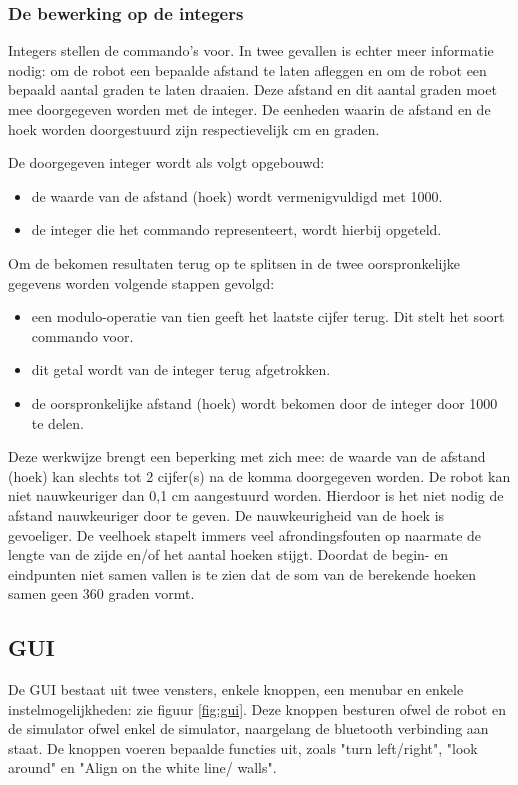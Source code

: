 \documentclass[tt3]{penoverslag}
\begin{document}
\subsubsection{De bewerking op de integers} %
\label{sssec:integer}
Integers stellen de commando's voor. In twee gevallen is echter meer informatie nodig: om de robot een bepaalde afstand te laten afleggen en om de robot een bepaald aantal graden te laten draaien. Deze afstand en dit aantal graden moet mee doorgegeven worden met de integer. De eenheden waarin de afstand en de hoek worden doorgestuurd zijn respectievelijk cm en graden.

De doorgegeven integer wordt als volgt opgebouwd:

\begin{itemize}
\item de waarde van de afstand (hoek) wordt vermenigvuldigd met 1000.
\item de integer die het commando representeert, wordt hierbij opgeteld.
\end{itemize}

Om de bekomen resultaten terug op te splitsen in de twee oorspronkelijke gegevens worden volgende stappen gevolgd:

\begin{itemize}
\item een modulo-operatie van tien geeft het laatste cijfer terug. Dit stelt het soort commando voor.
\item dit getal wordt van de integer terug afgetrokken.
\item de oorspronkelijke afstand (hoek) wordt bekomen door de integer door 1000 te delen.
\end{itemize}

Deze werkwijze brengt een beperking met zich mee: de waarde van de afstand (hoek) kan slechts tot 2 cijfer(s) na de komma doorgegeven worden. De robot kan niet nauwkeuriger dan 0,1 cm aangestuurd worden. Hierdoor is het niet nodig de afstand nauwkeuriger door te geven. De nauwkeurigheid van de hoek is gevoeliger. De veelhoek stapelt immers veel afrondingsfouten op naarmate de lengte van de zijde en/of het aantal hoeken stijgt. Doordat de begin- en eindpunten niet samen vallen is te zien dat de som van de berekende hoeken samen geen 360 graden vormt. 

\subsection{GUI} %
\label{ssec:GUI}
De GUI bestaat uit twee vensters, enkele knoppen, een menubar en enkele instelmogelijkheden: zie figuur \ref{fig:gui}. Deze knoppen besturen ofwel de robot en de simulator ofwel enkel de simulator, naargelang de bluetooth verbinding aan staat. De knoppen voeren bepaalde functies uit, zoals "turn left/right", "look around" en "Align on the white line/ walls".\\
\end{document}
